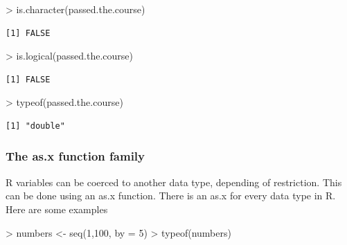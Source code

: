 \documentclass[
]{book}
\newenvironment{Shaded}{\begin{snugshade}}{\end{snugshade}}
\newcommand{\AttributeTok}[1]{\textcolor[rgb]{0.77,0.63,0.00}{#1}}
\newcommand{\DecValTok}[1]{\textcolor[rgb]{0.00,0.00,0.81}{#1}}
\newcommand{\FunctionTok}[1]{\textcolor[rgb]{0.00,0.00,0.00}{#1}}
\newcommand{\NormalTok}[1]{#1}
\newcommand{\OtherTok}[1]{\textcolor[rgb]{0.56,0.35,0.01}{#1}}
\newcommand{\SpecialCharTok}[1]{\textcolor[rgb]{0.00,0.00,0.00}{#1}}
\theoremstyle{definition}
\theoremstyle{definition}
\theoremstyle{definition}
\theoremstyle{definition}
\theoremstyle{remark}
\begin{document}
\begin{Shaded}
\begin{Highlighting}[]
\SpecialCharTok{\textgreater{}} \FunctionTok{is.character}\NormalTok{(passed.the.course)}
\end{Highlighting}
\end{Shaded}

\begin{verbatim}
[1] FALSE
\end{verbatim}

\begin{Shaded}
\begin{Highlighting}[]
\SpecialCharTok{\textgreater{}} \FunctionTok{is.logical}\NormalTok{(passed.the.course)}
\end{Highlighting}
\end{Shaded}

\begin{verbatim}
[1] FALSE
\end{verbatim}

\begin{Shaded}
\begin{Highlighting}[]
\SpecialCharTok{\textgreater{}} \FunctionTok{typeof}\NormalTok{(passed.the.course)}
\end{Highlighting}
\end{Shaded}

\begin{verbatim}
[1] "double"
\end{verbatim}

\hypertarget{the-as.x-function-family}{%
\subsubsection*{\texorpdfstring{\textbf{The as.x function family}}{The as.x function family}}\label{the-as.x-function-family}}

R variables can be coerced to another data type, depending of restriction.
This can be done using an as.x function. There is an as.x for every data type in R.
Here are some examples

\begin{Shaded}
\begin{Highlighting}[]
\SpecialCharTok{\textgreater{}}\NormalTok{ numbers }\OtherTok{\textless{}{-}} \FunctionTok{seq}\NormalTok{(}\DecValTok{1}\NormalTok{,}\DecValTok{100}\NormalTok{, }\AttributeTok{by =} \DecValTok{5}\NormalTok{)}
\SpecialCharTok{\textgreater{}} \FunctionTok{typeof}\NormalTok{(numbers)}
\end{Highlighting}
\end{Shaded}
\end{document}
